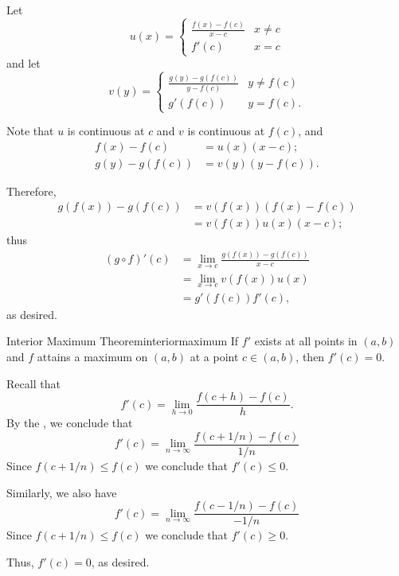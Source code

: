 \begin{dem}{}{}	
	Let \[
		u(x) =
		\begin{cases}
			\frac{f(x) - f(c)}{x - c} & x \neq c \\
			f'(c) & x = c
		\end{cases}
	\]
	and let \[
		v(y) =
		\begin{cases}
			\frac{g(y) - g(f(c))}{y - f(c)} & y \neq f(c) \\
			g'(f(c)) & y = f(c).
		\end{cases}
	\]

	Note that \(u\) is continuous at \(c\) and \(v\) is continuous at \(f(c)\), and
	\begin{align*}
		f(x) - f(c)		&= u(x)(x-c); \\
		g(y) - g(f(c))	&= v(y)(y-f(c)).
	\end{align*}

	Therefore,
	\begin{align*}
		g(f(x)) - g(f(c)) &= v(f(x))(f(x) - f(c)) \\
						  &= v(f(x))u(x)(x - c);
	\end{align*}
	thus
	\begin{align*}
		(g \circ f)'(c) &= \lim_{x \to c} \frac{g(f(x)) - g(f(c))}{x - c} \\
						&= \lim_{x \to c} v(f(x))u(x) \\
						&= g'(f(c))f'(c),
	\end{align*}
	as desired.
\end{dem}

\begin{thm}{Interior Maximum Theorem}{interiormaximum}
	If \(f'\) exists at all points in \((a, b)\) and \(f\) attains a maximum on \((a, b)\) at a point \(c \in (a, b)\), then \(f'(c) = 0\).
\end{thm}

\begin{dem}{}{}
	Recall that  \[
		f'(c) = \lim_{h \to 0} \frac{f(c + h) - f(c)}{h}.
	\]
	By the , we conclude that \[
		f'(c) = \lim_{n \to \infty} \frac{f(c + 1/n) - f(c)}{1/n}
	\]
	Since \(f(c + 1/n) \leq f(c)\) we conclude that \(f'(c) \leq 0\).

	Similarly, we also have \[
		f'(c) = \lim_{n \to \infty} \frac{f(c - 1/n) - f(c)}{-1/n}
	\]
	Since \(f(c + 1/n) \leq f(c)\) we conclude that \(f'(c) \geq 0\).

	Thus, \(f'(c) = 0\), as desired.
\end{dem}

